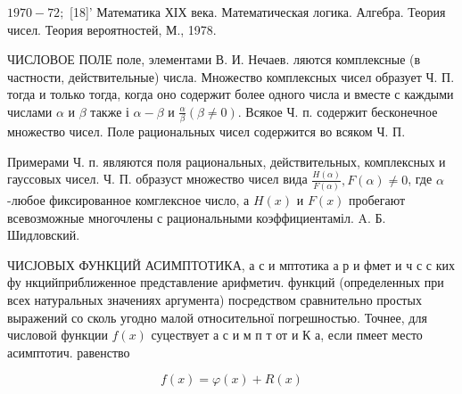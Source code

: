 \documentclass[10pt]{article}
\begin{document}
$1970-72 ;$ [18]' Математика ХІХ века. Математическая логика. Алгебра. Теория чисел. Теория вероятностей, М., 1978.



ЧИСЛОВОЕ ПОЛЕ поле, элементами В. И. Нечаев. ляются комплексные (в частности, действительные) числа. Множество комплексных чисел образует Ч. П. тогда и только тогда, когда оно содержит более одного числа и вместе с каждыми числами $\alpha$ и $\beta$ также і $\alpha-\beta$ и $\frac{\alpha}{\beta}(\beta \neq 0)$. Всякое Ч. п. содержит бесконечное множество чисел. Поле рациональных чисел содержится во всяком Ч. П.



Примерами Ч. п. являются поля рациональных, действительных, комплексных и гауссовых чисел. Ч. П. образуст множество чисел вида $\frac{H(\alpha)}{F(\alpha)}, F(\alpha) \neq 0$, где $\alpha$-любое фиксированное комглексное число, а $H(x)$ и $F(x)$ пробегают всевозможные многочлены с рациональными коэффициентаміл. A. Б. Шидловский.



ЧИСЈОВЫХ ФУНКЦИЙ АСИМПТОТИКА, а с и мптотика а р и фмет и ч с с ких фу нкцийприближенное представление арифметич. функций (определенных при всех натуральных значениях аргумента) посредством сравнительно простых выражений со сколь угодно малой относительної погрешностью. Точнее, для числовой функции $f(x)$ суцествует а с и м п т от и К а, если пмеет место асимптотич. равенство



\[

f(x)=\varphi(x)+R(x)

\]
\end{document}
